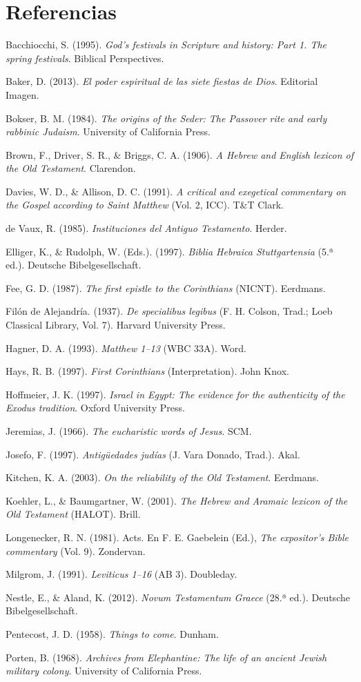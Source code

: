 \documentclass[11pt,letterpaper]{article}
\newcommand{\refapa}[1]{\par{\RaggedRight\hangindent=1.27cm\hangafter=1\noindent #1\par}\vspace{4pt}}
\begin{document}
\section*{Referencias}
\footnotesize
\refapa{Bacchiocchi, S. (1995). \emph{God's festivals in Scripture and history: Part 1. The spring festivals}. Biblical Perspectives.}
\refapa{Baker, D. (2013). \emph{El poder espiritual de las siete fiestas de Dios}. Editorial Imagen.}
\refapa{Bokser, B. M. (1984). \emph{The origins of the Seder: The Passover rite and early rabbinic Judaism}. University of California Press.}
\refapa{Brown, F., Driver, S. R., \& Briggs, C. A. (1906). \emph{A Hebrew and English lexicon of the Old Testament}. Clarendon.}
\refapa{Davies, W. D., \& Allison, D. C. (1991). \emph{A critical and exegetical commentary on the Gospel according to Saint Matthew} (Vol. 2, ICC). T\&T Clark.}
\refapa{de Vaux, R. (1985). \emph{Instituciones del Antiguo Testamento}. Herder.}
\refapa{Elliger, K., \& Rudolph, W. (Eds.). (1997). \emph{Biblia Hebraica Stuttgartensia} (5.ª ed.). Deutsche Bibelgesellschaft.}
\refapa{Fee, G. D. (1987). \emph{The first epistle to the Corinthians} (NICNT). Eerdmans.}
\refapa{Filón de Alejandría. (1937). \emph{De specialibus legibus} (F. H. Colson, Trad.; Loeb Classical Library, Vol. 7). Harvard University Press.}
\refapa{Hagner, D. A. (1993). \emph{Matthew 1--13} (WBC 33A). Word.}
\refapa{Hays, R. B. (1997). \emph{First Corinthians} (Interpretation). John Knox.}
\refapa{Hoffmeier, J. K. (1997). \emph{Israel in Egypt: The evidence for the authenticity of the Exodus tradition}. Oxford University Press.}
\refapa{Jeremias, J. (1966). \emph{The eucharistic words of Jesus}. SCM.}
\refapa{Josefo, F. (1997). \emph{Antigüedades judías} (J. Vara Donado, Trad.). Akal.}
\refapa{Kitchen, K. A. (2003). \emph{On the reliability of the Old Testament}. Eerdmans.}
\refapa{Koehler, L., \& Baumgartner, W. (2001). \emph{The Hebrew and Aramaic lexicon of the Old Testament} (HALOT). Brill.}
\refapa{Longenecker, R. N. (1981). Acts. En F. E. Gaebelein (Ed.), \emph{The expositor's Bible commentary} (Vol. 9). Zondervan.}
\refapa{Milgrom, J. (1991). \emph{Leviticus 1--16} (AB 3). Doubleday.}
\refapa{Nestle, E., \& Aland, K. (2012). \emph{Novum Testamentum Graece} (28.ª ed.). Deutsche Bibelgesellschaft.}
\refapa{Pentecost, J. D. (1958). \emph{Things to come}. Dunham.}
\refapa{Porten, B. (1968). \emph{Archives from Elephantine: The life of an ancient Jewish military colony}. University of California Press.}
\end{document}
